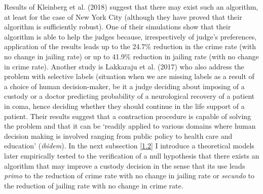 \documentclass[12pt, twoside]{book} %
\begin{document}
Results of Kleinberg et al. (2018) suggest that there may exist such an algorithm, at least for the case of New York City (although they have proved that their algorithm is sufficiently robust). One of their simulations show that their algorithm is able to help the judges because, irrespectively of judge's preferences, application of the results leads up to the 24.7\% reduction in the crime rate (with no change in jailing rate) or up to 41.9\% reduction in jailing rate (with no change in crime rate). Another study is Lakkaraju et al. (2017) who also address the problem with selective labels (situation when we are missing labels as a result of a choice of human decision-maker, be it a judge deciding about imposing of a custody or a doctor predicting probability of a neurological recovery of a patient in coma, hence deciding whether they should continue in the life support of a patient. Their results suggest that a contraction procedure is capable of solving the problem and that it can be ‘readily applied to various domains where human decision making is involved ranging from public policy to health care and education’ (\textit{ibidem}). \newline 
In the next subsection \ref{1.2} I introduce a theoretical models later empirically tested to the verification of a null hypothesis that there exists an algorithm that may improve a custody decision in the sense that its use leads \textit{primo} to the reduction of crime rate with no change in jailing rate or \textit{secundo} to the reduction of jailing rate with no change in crime rate. 
\end{document}
